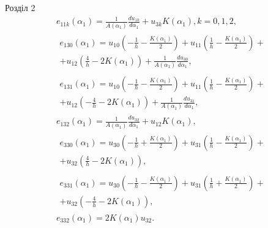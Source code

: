 \documentclass[handout, 8pt]{beamer}
\numberwithin{figure}{section}
\numberwithin{equation}{section}
\numberwithin{table}{section}
\begin{document}
\begin{frame}{Розділ 2}
\begin{equation}\label{eq:sqt_strain_l}
\begin{aligned}
&e_{11k}\left(\alpha_1\right)=\frac{1}{A\left(\alpha_1\right)}\frac{du_{1k}}{d\alpha_1}+u_{3k}K\left(\alpha_1\right), k=0,1,2,
\\
&\begin{split}
e_{130}\left(\alpha_1\right)=u_{10}\left( -\frac{1}{h}-\frac{K\left( \alpha_1 \right)}{2} \right)+u_{11}\left( \frac{1}{h}-\frac{K\left( \alpha_1 \right)}{2} \right)+ \\ +u_{12}\left( \frac{4}{h}-2K\left( \alpha_1 \right) \right) + \frac{1}{A\left(\alpha_1\right)}\frac{du_{30}}{d\alpha_1},
\end{split}\\
&\begin{split}
e_{131}\left(\alpha_1\right)=u_{10}\left( -\frac{1}{h}-\frac{K\left( \alpha_1 \right)}{2} \right)+u_{11}\left( \frac{1}{h}-\frac{K\left( \alpha_1 \right)}{2} \right)+\\+u_{12}\left( - \frac{4}{h}-2K\left( \alpha_1 \right) \right) + \frac{1}{A\left(\alpha_1\right)}\frac{du_{31}}{d\alpha_1},
\end{split}\\
&e_{132}\left(\alpha_1\right)=\frac{1}{A\left(\alpha_1\right)}\frac{du_{32}}{d\alpha_1}+u_{12}K\left(\alpha_1\right),\\
&\begin{split}
e_{330}\left(\alpha_1\right)=u_{30}\left( -\frac{1}{h}+\frac{K\left( \alpha_1 \right)}{2} \right)+u_{31}\left( \frac{1}{h}-\frac{K\left( \alpha_1 \right)}{2} \right)+\\+u_{32}\left( \frac{4}{h}-2K\left( \alpha_1 \right) \right),
\end{split}\\
&\begin{split}
e_{331}\left(\alpha_1\right)=u_{30}\left( -\frac{1}{h}-\frac{K\left( \alpha_1 \right)}{2} \right)+u_{31}\left( \frac{1}{h}+\frac{K\left( \alpha_1 \right)}{2} \right)+\\+u_{32}\left( -\frac{4}{h}-2K\left( \alpha_1 \right) \right),
\end{split}\\
&e_{332}\left(\alpha_1\right)=2K\left( \alpha_1 \right)u_{32}.
\end{aligned}
\end{equation}
\end{frame}
\end{document}
